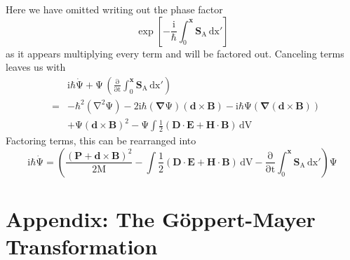Here we have omitted writing out the phase factor 
\begin{equation}
\mathrm{\exp{\left[-\frac{\mathrm{i}}{\mathrm{\hbar}}\int_0^\mathbf{x}\mathbf{S}_A\,\mathrm{dx'}\right]}}
\label{phasefactor}
\end{equation}
as it appears multiplying every term and will be factored out.  Canceling terms leaves us with
\begin{eqnarray}
&&\mathrm{\mathrm{i}\mathrm{\hbar}\dot{\Psi}+\Psi\,\left(\frac{\partial}{\partial t}\mathrm{\int_0^\mathbf{x} \mathbf{S}_A \, \mathrm{dx'}}\right)}\nonumber \\
&=&\mathrm{-\hbar^2(\nabla^2\Psi) -2i\hbar(\mathbf{\nabla}\Psi)(\mathbf{d}\times\mathbf{B})-i\hbar\Psi(\mathbf{\nabla}(\mathbf{d}\times\mathbf{B}))}\nonumber \\
&&\mathrm{+\Psi(\mathbf{d}\times\mathbf{B})^2-\Psi\int\frac{1}{2}\left(\mathbf{D\cdot E +H\cdot B}\right)\,dV}
\label{schrodingera3}
\end{eqnarray}
Factoring terms, this can be rearranged into
\begin{equation}
\mathrm{i\mathrm{\hbar}\dot{\Psi}=\mathrm{\left(\frac{\left(\mathbf{P}+\mathbf{d}\times\mathbf{B}\right)^2}{2M}-\int\frac{1}{2}\left(\mathbf{D\cdot E}+\mathbf{H\cdot B}\right)\,dV-\frac{\partial}{\partial t}\int_0^\mathbf{x} \mathbf{S}_A\,\mathrm{dx'}\right)\Psi}}
\label{schrodingera4}
\end{equation}



\newpage
\section{Appendix: The G\"{o}ppert-Mayer Transformation }
\label{App_1-2} 


